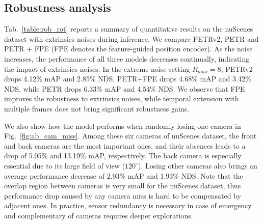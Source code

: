 \documentclass[10pt,twocolumn,letterpaper]{article}
\begin{document}
\subsection{Robustness analysis}
Tab.~\ref{table:rob_rot} reports a summary of quantitative results on the nuScenes dataset with extrinsics noises during inference. We compare PETRv2, PETR and PETR + FPE (FPE denotes the feature-guided position encoder).
As the noise increases, the performance of all three models decreases continually, indicating the impact of extrinsics noises. In the extreme noise setting $R_{max}=8$, PETRv2 drops 4.12\% mAP and 2.85\% NDS, PETR+FPE drops 4.68\% mAP and 3.42\% NDS, while PETR drops 6.33\% mAP and 4.54\% NDS. We observe that FPE improves the robustness to extrinsics noises, while temporal extension with multiple frames does not bring significant robustness gains.

\begin{table}[h]
\caption{Quantitative results on the nuScenes val set with extrinsics noises. The metrics in each cell are mAP[\%]. $R_{max}=M$ denotes the maximum angle of three axes is M in degree. }
    \label{table:rob_rot}
\end{table}

We also show how the model performs when randomly losing one camera in Fig.~\ref{fig:ab_cam_miss}. Among these six cameras of nuScenes dataset, the front and back cameras are the most important ones, and their absences leads to a drop of 5.05\% and 13.19\% mAP, respectively. The back camera is especially essential due to its large field of view ($120^{\circ}$). Losing other cameras also brings an average performance decrease of 2.93\% mAP and 1.93\% NDS. Note that the overlap region between cameras is very small for the nuScenes dataset, thus performance drop caused by any camera miss is hard to be compensated by adjacent ones. In practice, sensor redundancy is necessary in case of emergency and complementary of cameras requires deeper explorations.
\end{document}
